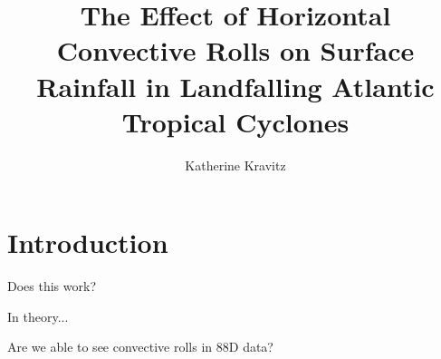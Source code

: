 \documentclass[12pt]{article}
\author{Katherine Kravitz} \title{The Effect of Horizontal Convective Rolls on Surface Rainfall in Landfalling Atlantic Tropical Cyclones}
\begin{document}
\maketitle


\section{Introduction}
Does this work? 

In theory...

Are we able to see convective rolls in 88D data?
\end{document}
